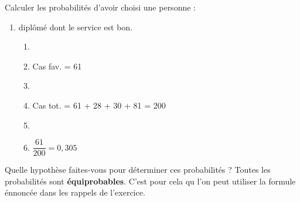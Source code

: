 \begin{exo}
\begin{subexo}{Calculer les probabilités d’avoir choisi une personne :}
\begin{enumerate}[parsep=0cm, itemsep=3mm, topsep=3mm]
\begin{enumerate}
      \item[ ] \begin{center}{Cas fav.} = 30 + 81 = 111\end{center}
      \item[ ] 
      \item[ ] \begin{center}{Cas tot.} = 61 + 28 + 30 + 81 = 200\end{center}
      \item[ ] 
      \item[ ] \begin{center}$\dfrac{111}{200} = 0,555$\end{center}
    \end{enumerate}
    \item diplômé dont le service est bon.
    \begin{enumerate}
      \item[ ] 
      \item[ ] \begin{center}{Cas fav.} = 61\end{center}
      \item[ ] 
      \item[ ] \begin{center}{Cas tot.} = 61 + 28 + 30 + 81 = 200\end{center}
      \item[ ] 
      \item[ ] \begin{center}$\dfrac{61}{200} = 0,305$\end{center}
    \end{enumerate}
  \end{enumerate}
  \end{subexo}
  \begin{subexo}{Quelle hypothèse faites-vous pour déterminer ces probabilités ?}
    Toutes les probabilités sont \textbf{équiprobables}. C'est pour cela qu l'on peut utiliser la formule énnoncée dans les rappels de l'exercice.

  \end{subexo}
\end{exo}
